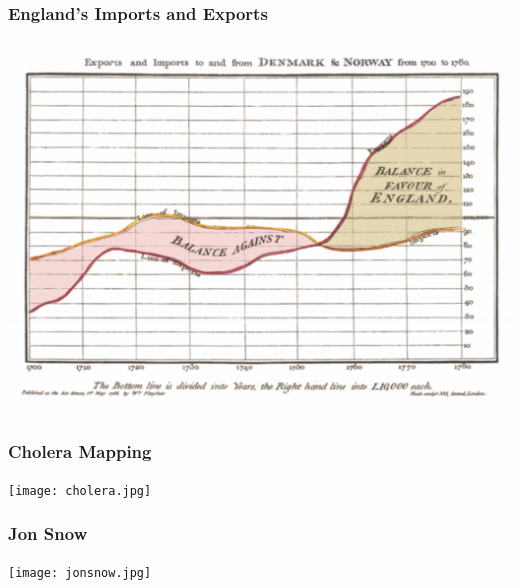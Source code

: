\documentclass{beamer} %
\begin{document}
\begin{frame}\frametitle{England's Imports and Exports}
		\centering
	\includegraphics[width=\linewidth]{england.png}
\end{frame}


\begin{frame}\frametitle{Cholera Mapping}
		\centering
	\texttt{[image: cholera.jpg]}
\end{frame}


\begin{frame}\frametitle{Jon Snow}
		\centering
	\texttt{[image: jonsnow.jpg]}
\end{frame}
\end{document}
